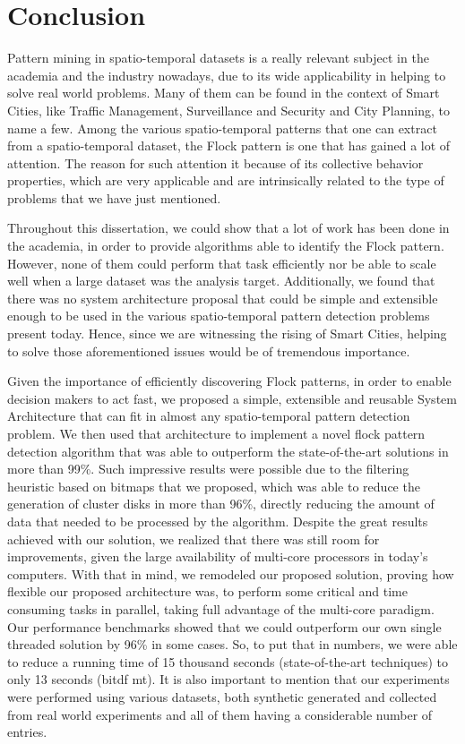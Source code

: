 \chapter{Conclusion}
\label{chp:conclusion}
Pattern mining in spatio-temporal datasets is a really relevant subject in the academia and the industry nowadays, due
to its wide applicability in helping to solve real world problems. Many of them can be found in the context of Smart
Cities, like Traffic Management, Surveillance and Security and City Planning, to name a few. Among the various
spatio-temporal patterns that one can extract from a spatio-temporal dataset, the Flock pattern is one that has gained a
lot of attention. The reason for such attention it because of its collective behavior properties, which are very
applicable and are intrinsically related to the type of problems that we have just mentioned.

Throughout this dissertation, we could show that a lot of work has been done in the academia, in order to provide
algorithms able to identify the Flock pattern. However, none of them could perform that task efficiently nor be able to
scale well when a large dataset was the analysis target. Additionally, we found that there was no system architecture
proposal that could be simple and extensible enough to be used in the various spatio-temporal pattern detection problems
present today. Hence, since we are witnessing the rising of Smart Cities, helping to solve those aforementioned issues
would be of tremendous importance.

Given the importance of efficiently discovering Flock patterns, in order to enable decision makers to act fast, we
proposed a simple, extensible and reusable System Architecture that can fit in almost any spatio-temporal pattern
detection problem. We then used that architecture to implement a novel flock pattern detection algorithm that was able
to outperform the state-of-the-art solutions in more than 99\%. Such impressive results were possible due to the
filtering heuristic based on bitmaps that we proposed, which was able to reduce the generation of cluster disks in more
than 96\%, directly reducing the amount of data that needed to be processed by the algorithm. Despite the great results
achieved with our solution, we realized that there was still room for improvements, given the large availability of
multi-core processors in today's computers. With that in mind, we remodeled our proposed solution, proving how flexible
our proposed architecture was, to perform some critical and time consuming tasks in parallel, taking full advantage of
the multi-core paradigm. Our performance benchmarks showed that we could outperform our own single threaded solution by
96\% in some cases. So, to put that in numbers, we were able to reduce a running time of 15 thousand seconds
(state-of-the-art techniques) to only 13 seconds (\ac{bitdf} \ac{mt}). It is also important to mention that our
experiments were performed using various datasets, both synthetic generated and collected from real world experiments
and all of them having a considerable number of entries.

